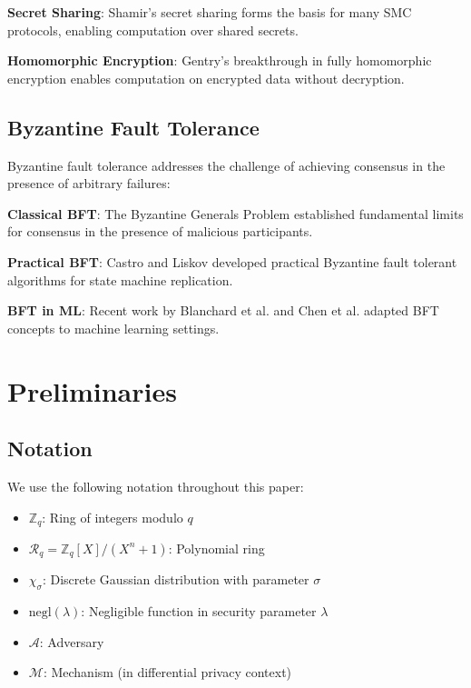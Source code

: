 \documentclass[journal,onecolumn,draftclsnofoot]{IEEEtran}
\begin{document}
\textbf{Secret Sharing}: Shamir's secret sharing \cite{shamir1979share} forms the basis for many SMC protocols, enabling computation over shared secrets.

\textbf{Homomorphic Encryption}: Gentry's breakthrough \cite{gentry2009fully} in fully homomorphic encryption enables computation on encrypted data without decryption.

\subsection{Byzantine Fault Tolerance}

Byzantine fault tolerance addresses the challenge of achieving consensus in the presence of arbitrary failures:

\textbf{Classical BFT}: The Byzantine Generals Problem \cite{lamport1982byzantine} established fundamental limits for consensus in the presence of malicious participants.

\textbf{Practical BFT}: Castro and Liskov \cite{castro1999practical} developed practical Byzantine fault tolerant algorithms for state machine replication.

\textbf{BFT in ML}: Recent work by Blanchard et al. \cite{blanchard2017machine} and Chen et al. \cite{chen2017distributed} adapted BFT concepts to machine learning settings.

\section{Preliminaries}

\subsection{Notation}

We use the following notation throughout this paper:
\begin{itemize}
\item $\mathbb{Z}_q$: Ring of integers modulo $q$
\item $\mathcal{R}_q = \mathbb{Z}_q[X]/(X^n + 1)$: Polynomial ring
\item $\chi_\sigma$: Discrete Gaussian distribution with parameter $\sigma$
\item $\text{negl}(\lambda)$: Negligible function in security parameter $\lambda$
\item $\mathcal{A}$: Adversary
\item $\mathcal{M}$: Mechanism (in differential privacy context)
\end{itemize}
\end{document}
